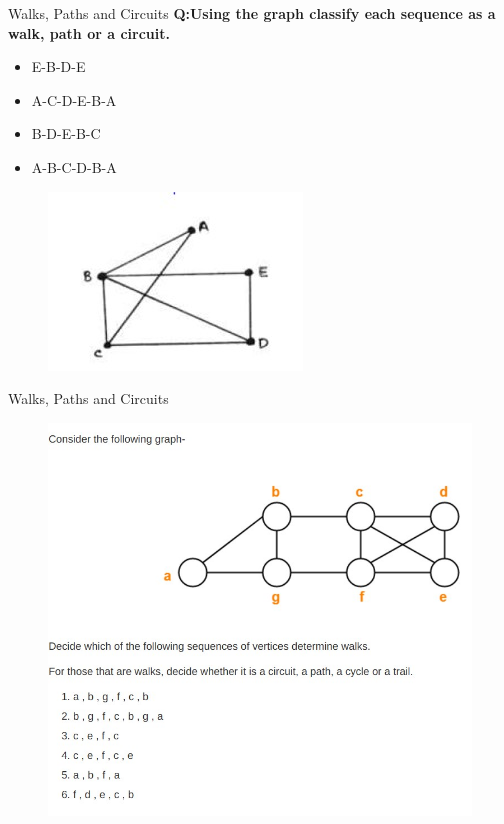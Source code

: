 \documentclass{beamer}
\begin{document}
\begin{frame}{Walks, Paths and Circuits}
	\textbf{Q:Using the graph classify each sequence as a walk, path or a circuit.}
	\begin{itemize}
		\item E-B-D-E
		\item A-C-D-E-B-A
		\item B-D-E-B-C
		\item A-B-C-D-B-A
	\end{itemize}
	
	\begin{figure}
		\includegraphics[scale=.6]{img/m34}
	\end{figure}
\end{frame}
\begin{frame}{Walks, Paths and Circuits}
	\begin{figure}
		\includegraphics[scale=.55]{img/m44}
	\end{figure}
\end{frame}
\end{document}
